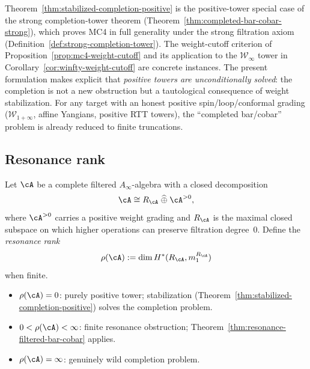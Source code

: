 \begin{remark}
\label{rem:stabilized-vs-mc4-criteria}
Theorem~\ref{thm:stabilized-completion-positive} is the
positive-tower special case of the strong completion-tower
theorem (Theorem~\ref{thm:completed-bar-cobar-strong}),
which proves MC4 in full generality under the strong filtration
axiom (Definition~\ref{def:strong-completion-tower}).
The weight-cutoff criterion of
Proposition~\ref{prop:mc4-weight-cutoff} and its application to
the $\mathcal{W}_\infty$ tower in
Corollary~\ref{cor:winfty-weight-cutoff} are concrete instances.
The present formulation
makes explicit that \emph{positive towers are unconditionally
solved}: the completion is not a new obstruction but a tautological
consequence of weight stabilization.  For any target with an
honest positive spin/loop/conformal grading ($\mathcal{W}_{1+\infty}$,
affine Yangians, positive RTT towers), the ``completed bar/cobar''
problem is already reduced to finite truncations.
\end{remark}

\subsection{Resonance rank}

\begin{definition}
\label{def:resonance-rank}
Let $\cA$ be a complete filtered $A_\infty$-algebra with a closed
decomposition
\[
\cA \cong R_\cA \;\widehat{\oplus}\; \cA^{>0},
\]
where $\cA^{>0}$ carries a positive weight grading and $R_\cA$ is
the maximal closed subspace on which higher operations can preserve
filtration degree~$0$.  Define the \emph{resonance rank}
\[
\rho(\cA) := \dim H^*(R_\cA, m_1^{R_\cA})
\]
when finite.
\begin{itemize}
\item $\rho(\cA) = 0$: purely positive tower;
  stabilization (Theorem~\ref{thm:stabilized-completion-positive})
  solves the completion problem.
\item $0 < \rho(\cA) < \infty$: finite resonance obstruction;
  Theorem~\ref{thm:resonance-filtered-bar-cobar} applies.
\item $\rho(\cA) = \infty$: genuinely wild completion problem.
\end{itemize}
\end{definition}

